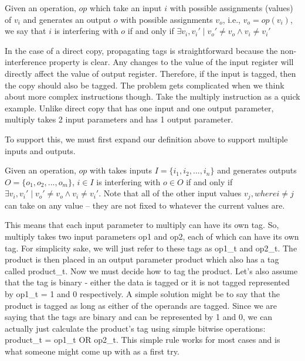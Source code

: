 \begin{definition}
Given an operation, $op$ which take an input $i$ with possible assignments (values) of $v_i$ and 
generates an output $o$ with possible assignments $v_o$, i.e., $v_o = op(v_i)$, 
we say that $i$ is interfering with $o$ if and only if $\exists v_i, v_i' \mid v_o' \neq v_o \land v_i \neq v_i'$
\end{definition}

In the case of a direct copy, propagating tags is
straightforward because the non-interference property is clear. Any changes to the value of the input 
register will directly affect the value of output register. Therefore, if the input is tagged, then 
the copy should also be tagged. The problem gets
complicated when we think about more complex instructions though. Take the multiply instruction as a
quick example. Unlike direct copy that has one input and one output parameter, multiply takes 2 input
parameters and has 1 output parameter.

To support this, we must first expand our definition above to support multiple inputs and outputs.

\begin{definition}
Given an operation, $op$ with takes inputs $I = \{i_1, i_2, ..., i_n\}$ and generates outputs $O = \{o_1, o_2, ..., o_m\}$, 
$i \in I$ is interfering with $o \in O$ if and only if $\exists v_i, v_i' \mid v_o' \neq v_o \land v_i \neq v_i'$. Note 
that all of the other input values $v_j, where i \neq j$ can take on any value -- they are not fixed to whatever the current
values are.
\end{definition}


This means that each input parameter to multiply can have its own tag. So, multiply takes two input
parameters op1 and op2, each of which can have its own tag. For simplicity sake, we will just refer to
these tags as op1\_t and op2\_t. The product is then placed in an output parameter product which also
has a tag called product\_t. Now we must decide how to tag the product. Let’s also assume that the tag is
binary - either the data is tagged or it is not tagged represented by op1\_t = 1 and 0 respectively.
A simple solution might be to say that the product is tagged as long as either of the operands are tagged.
Since we are saying that the tags are binary and can be represented by 1 and 0, we can actually just
calculate the product’s tag using simple bitwise operations: product\_t = op1\_t OR op2\_t. This simple rule
works for most cases and is what someone might come up with as a first try.

